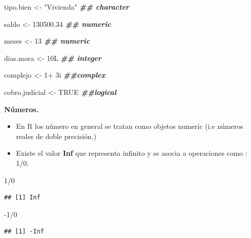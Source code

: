 \documentclass[
  12pt,
]{book}
\newenvironment{Shaded}{\begin{snugshade}}{\end{snugshade}}
\newcommand{\ConstantTok}[1]{\textcolor[rgb]{0.00,0.00,0.00}{#1}}
\newcommand{\DecValTok}[1]{\textcolor[rgb]{0.00,0.00,0.81}{#1}}
\newcommand{\DocumentationTok}[1]{\textcolor[rgb]{0.56,0.35,0.01}{\textbf{\textit{#1}}}}
\newcommand{\FloatTok}[1]{\textcolor[rgb]{0.00,0.00,0.81}{#1}}
\newcommand{\NormalTok}[1]{#1}
\newcommand{\OtherTok}[1]{\textcolor[rgb]{0.56,0.35,0.01}{#1}}
\newcommand{\SpecialCharTok}[1]{\textcolor[rgb]{0.00,0.00,0.00}{#1}}
\newcommand{\StringTok}[1]{\textcolor[rgb]{0.31,0.60,0.02}{#1}}
\providecommand{\tightlist}{%
  \setlength{\itemsep}{0pt}\setlength{\parskip}{0pt}}
\begin{document}
\begin{Shaded}
\begin{Highlighting}[]
\NormalTok{tipo.bien }\OtherTok{\textless{}{-}} \StringTok{"Vivienda"}   \DocumentationTok{\#\# character}

\NormalTok{saldo }\OtherTok{\textless{}{-}} \FloatTok{130500.34}        \DocumentationTok{\#\# numeric}

\NormalTok{meses }\OtherTok{\textless{}{-}} \DecValTok{13}               \DocumentationTok{\#\# numeric}

\NormalTok{dias.mora }\OtherTok{\textless{}{-}}\NormalTok{ 10L          }\DocumentationTok{\#\# integer}

\NormalTok{complejo }\OtherTok{\textless{}{-}} \DecValTok{1}\SpecialCharTok{+}\NormalTok{ 3i         }\DocumentationTok{\#\#complex}

\NormalTok{cobro.judicial }\OtherTok{\textless{}{-}} \ConstantTok{TRUE}    \DocumentationTok{\#\#logical}
\end{Highlighting}
\end{Shaded}

\textbf{Números.}

\begin{itemize}
\tightlist
\item
  En R los número en general se tratan como objetos numeric (i.e números reales de doble precisión.)
\item
  Existe el valor \textbf{Inf} que representa infinito y se asocia a operaciones como : 1/0.
\end{itemize}

\begin{Shaded}
\begin{Highlighting}[]
\DecValTok{1}\SpecialCharTok{/}\DecValTok{0}
\end{Highlighting}
\end{Shaded}

\begin{verbatim}
## [1] Inf
\end{verbatim}

\begin{Shaded}
\begin{Highlighting}[]
\SpecialCharTok{{-}}\DecValTok{1}\SpecialCharTok{/}\DecValTok{0}
\end{Highlighting}
\end{Shaded}

\begin{verbatim}
## [1] -Inf
\end{verbatim}
\end{document}
